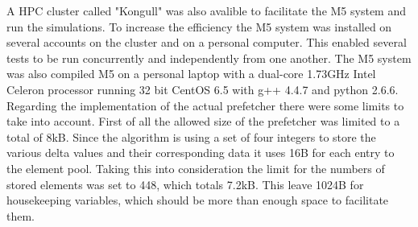 A HPC cluster called "Kongull" was also avalible to facilitate the M5 system and run the simulations. To increase the efficiency the M5 system was installed on several accounts on the cluster and on a personal computer. This enabled several tests to be run concurrently and independently from one another. The M5 system was also compiled M5 on a personal laptop with a dual-core 1.73GHz Intel Celeron processor running 32 bit CentOS 6.5 with g++ 4.4.7 and python 2.6.6. 
Regarding the implementation of the actual prefetcher there were some limits to take into account. First of all the allowed size of the prefetcher was limited to a total of 8kB. Since the algorithm is using a set of four integers to store the various delta values and their corresponding data it uses 16B for each entry to the element pool. Taking this into consideration the limit for the numbers of stored elements was set to 448, which totals 7.2kB. This leave 1024B for housekeeping variables, which should be more than enough space to facilitate them.
